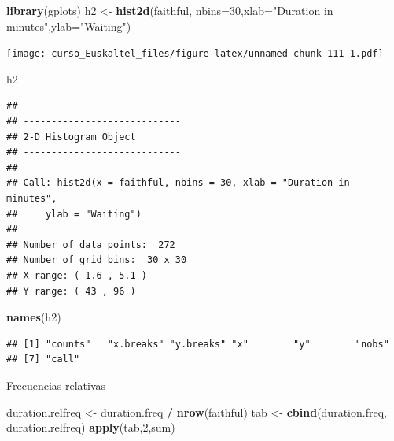 \documentclass[]{book}
\newenvironment{Shaded}{\begin{snugshade}}{\end{snugshade}}
\newcommand{\KeywordTok}[1]{\textcolor[rgb]{0.13,0.29,0.53}{\textbf{#1}}}
\newcommand{\DataTypeTok}[1]{\textcolor[rgb]{0.13,0.29,0.53}{#1}}
\newcommand{\DecValTok}[1]{\textcolor[rgb]{0.00,0.00,0.81}{#1}}
\newcommand{\StringTok}[1]{\textcolor[rgb]{0.31,0.60,0.02}{#1}}
\newcommand{\OperatorTok}[1]{\textcolor[rgb]{0.81,0.36,0.00}{\textbf{#1}}}
\newcommand{\NormalTok}[1]{#1}
\begin{document}
\begin{Shaded}
\begin{Highlighting}[]
\KeywordTok{library}\NormalTok{(gplots)}
\NormalTok{h2 <-}\StringTok{ }\KeywordTok{hist2d}\NormalTok{(faithful, }\DataTypeTok{nbins=}\DecValTok{30}\NormalTok{,}\DataTypeTok{xlab=}\StringTok{"Duration in minutes"}\NormalTok{,}\DataTypeTok{ylab=}\StringTok{"Waiting"}\NormalTok{)}
\end{Highlighting}
\end{Shaded}

\texttt{[image: curso\_Euskaltel\_files/figure-latex/unnamed-chunk-111-1.pdf]}

\begin{Shaded}
\begin{Highlighting}[]
\NormalTok{h2}
\end{Highlighting}
\end{Shaded}

\begin{verbatim}
## 
## ----------------------------
## 2-D Histogram Object
## ----------------------------
## 
## Call: hist2d(x = faithful, nbins = 30, xlab = "Duration in minutes", 
##     ylab = "Waiting")
## 
## Number of data points:  272 
## Number of grid bins:  30 x 30 
## X range: ( 1.6 , 5.1 )
## Y range: ( 43 , 96 )
\end{verbatim}

\begin{Shaded}
\begin{Highlighting}[]
\KeywordTok{names}\NormalTok{(h2)}
\end{Highlighting}
\end{Shaded}

\begin{verbatim}
## [1] "counts"   "x.breaks" "y.breaks" "x"        "y"        "nobs"    
## [7] "call"
\end{verbatim}

Frecuencias relativas

\begin{Shaded}
\begin{Highlighting}[]
\NormalTok{duration.relfreq <-}\StringTok{ }\NormalTok{duration.freq }\OperatorTok{/}\StringTok{ }\KeywordTok{nrow}\NormalTok{(faithful) }
\NormalTok{tab <-}\StringTok{ }\KeywordTok{cbind}\NormalTok{(duration.freq, duration.relfreq) }
\KeywordTok{apply}\NormalTok{(tab,}\DecValTok{2}\NormalTok{,sum)}
\end{Highlighting}
\end{Shaded}
\end{document}
